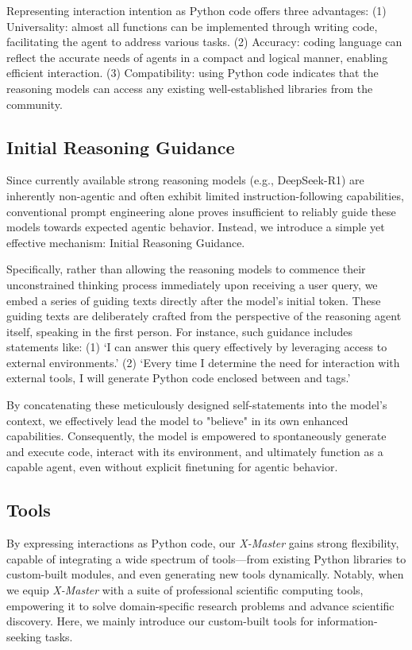 \documentclass{article}
\newcommand{\textboxStyle}[2]{%
    \tikzmarknode[draw=#1,thick,fill=white,rounded corners=2pt,inner sep=2pt]{boxnode}{#2}%
}
\newcommand{\thinkStart}{\textboxStyle{think_text}{\textbf{\textcolor{think_text}{<think>}}}}
\newcommand{\codeStart}{\textboxStyle{code_text}{\textbf{\textcolor{code_text}{<code>}}}}
\newcommand{\codeEnd}{\textboxStyle{code_text}{\textbf{\textcolor{code_text}{</code>}}}}
\begin{document}
Representing interaction intention as Python code offers three advantages:
(1) Universality: almost all functions can be implemented through writing code, facilitating the agent to address various tasks.
(2) Accuracy: coding language can reflect the accurate needs of agents in a compact and logical manner, enabling efficient interaction.
(3) Compatibility: using Python code indicates that the reasoning models can access any existing well-established libraries from the community.

\subsection{Initial Reasoning Guidance}

Since currently available strong reasoning models (e.g., DeepSeek-R1) are inherently non-agentic and often exhibit limited instruction-following capabilities, conventional prompt engineering alone proves insufficient to reliably guide these models towards expected agentic behavior.
Instead, we introduce a simple yet effective mechanism: Initial Reasoning Guidance.

Specifically, rather than allowing the reasoning models to commence their unconstrained thinking process immediately upon receiving a user query, we embed a series of guiding texts directly after the model's initial \thinkStart token.
These guiding texts are deliberately crafted from the perspective of the reasoning agent itself, speaking in the first person. For instance, such guidance includes statements like:
(1) `I can answer this query effectively by leveraging access to external environments.'
(2) `Every time I determine the need for interaction with external tools, I will generate Python code enclosed between \codeStart and \codeEnd tags.'

By concatenating these meticulously designed self-statements into the model's context, we effectively lead the model to "believe" in its own enhanced capabilities.
Consequently, the model is empowered to spontaneously generate and execute code, interact with its environment, and ultimately function as a capable agent, even without explicit finetuning for agentic behavior.

\subsection{Tools}

By expressing interactions as Python code, our \emph{X-Master} gains strong flexibility, capable of integrating a wide spectrum of tools—from existing Python libraries to custom-built modules, and even generating new tools dynamically. Notably, when we equip \emph{X-Master} with a suite of professional scientific computing tools, empowering it to solve domain-specific research problems and advance scientific discovery. Here, we mainly introduce our custom-built tools for information-seeking tasks.
\end{document}
